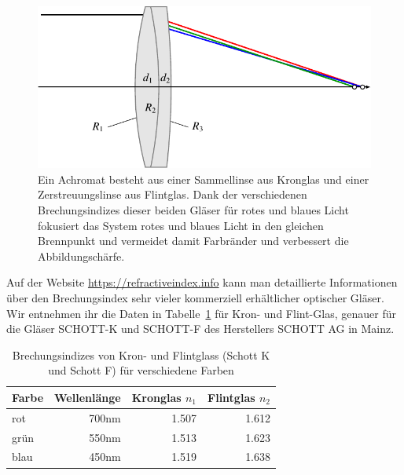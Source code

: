 \begin{figure}
\centering
\includegraphics{applications/matrixoptik/achr.pdf}
\caption{Ein Achromat besteht aus einer Sammellinse aus Kronglas und einer
Zerstreuungslinse aus Flintglas.
Dank der verschiedenen Brechungsindizes dieser beiden Gläser für rotes
und blaues Licht fokusiert das System rotes und blaues Licht in den gleichen
Brennpunkt und vermeidet damit Farbränder und verbessert die Abbildungschärfe.
\label{mo:achr}}
\end{figure}

Auf der Website \url{https://refractiveindex.info} kann man detaillierte
Informationen über den Brechungsindex sehr vieler kommerziell erhältlicher
optischer Gläser.
Wir entnehmen ihr die Daten in Tabelle~\ref{mo:indextabelle} für Kron-
und Flint-Glas, genauer für die Gläser SCHOTT-K und SCHOTT-F des Herstellers
SCHOTT AG in Mainz.
\begin{table}
\centering
\begin{tabular}{|l|r|r|r|}
\hline
Farbe&Wellenlänge&Kronglas $n_1$&Flintglas $n_2$\\
\hline
rot  &700nm& 1.507&1.612\\
grün &550nm& 1.513&1.623\\
blau &450nm& 1.519&1.638\\
\hline
\end{tabular}
\caption{Brechungsindizes von Kron- und Flintglass (Schott K und Schott F)
für verschiedene Farben
\label{mo:indextabelle}}
\end{table}

